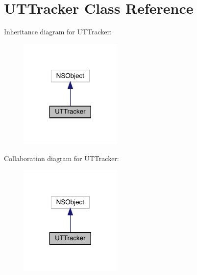 \hypertarget{interface_u_t_tracker}{}\section{U\+T\+Tracker Class Reference}
\label{interface_u_t_tracker}


Inheritance diagram for U\+T\+Tracker\+:\nopagebreak
\begin{figure}[H]
\begin{center}
\leavevmode
\includegraphics[width=143pt]{interface_u_t_tracker__inherit__graph}
\end{center}
\end{figure}


Collaboration diagram for U\+T\+Tracker\+:\nopagebreak
\begin{figure}[H]
\begin{center}
\leavevmode
\includegraphics[width=143pt]{interface_u_t_tracker__coll__graph}
\end{center}
\end{figure}
